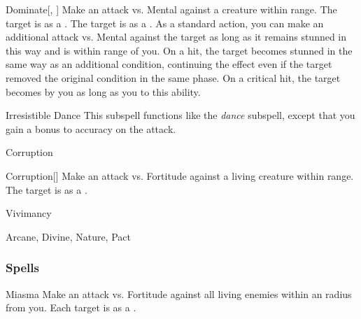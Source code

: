 \begin{ability}[\nth{4}]{Dominate}[, ]
Make an attack vs. Mental against a creature within \rngmed range.
\hit The target is  as a .
\crit The target is  as a .
As a standard action, you can make an additional attack vs. Mental against the target as long as it remains stunned in this way and is within \rngmed range of you.
On a hit, the target becomes stunned in the same way as an additional condition, continuing the effect even if the target removed the original condition in the same phase.
On a critical hit, the target becomes  by you as long as you  to this ability.
\end{ability}
\vspace{0.25em}



\begin{ability}[\nth{6}]{Irresistible Dance}
This subspell functions like the \textit{dance} subspell, except that you gain a  bonus to accuracy on the attack.
\end{ability}
\vspace{0.25em}


\newpage
\begin{spellsection}{Corruption}

\begin{spellheader}
\end{spellheader}


\begin{ability}{Corruption}[]
Make an attack vs. Fortitude against a living creature within \rngclose range.
\hit The target is  as a .
\end{ability}




 Vivimancy

 Arcane, Divine, Nature, Pact
\end{spellsection}


\subsubsection{Spells}


\begin{ability}[\nth{1}]{Miasma}
Make an attack vs. Fortitude against all living enemies within an \areamed radius from you.
\hit Each target is  as a .
\end{ability}
\vspace{0.25em}



